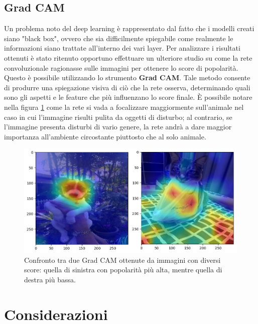 \subsection{Grad CAM}

Un problema noto del deep learning è rappresentato dal fatto che i modelli creati siano "black box", ovvero che sia difficilmente spiegabile come realmente le informazioni siano trattate all'interno dei vari layer. Per analizzare i risultati ottenuti è stato ritenuto opportuno effettuare un ulteriore studio su come la rete convoluzionale ragionasse sulle immagini per ottenere lo score di popolarità. Questo è possibile utilizzando lo strumento \textbf{Grad CAM}\cite{2019}. Tale metodo consente di produrre una spiegazione visiva di ciò che la rete osserva, determinando quali sono gli aspetti e le feature che più influenzano lo score finale. È possibile notare nella figura \ref{fig:grad-cam} come la rete si vada a focalizzare maggiormente sull'animale nel caso in cui l'immagine risulti pulita da oggetti di disturbo; al contrario, se l'immagine presenta disturbi di vario genere, la rete andrà a dare maggior importanza all'ambiente circostante piuttosto che al solo animale.

\vspace{1cm}

\begin{figure}[h]
        \centering
        \includegraphics[scale=0.6]{Plot/GRAD-CAM.png}
        \caption{Confronto tra due Grad CAM ottenute da immagini con diversi score: quella di sinistra con popolarità più alta, mentre quella di destra più bassa.}
        \label{fig:grad-cam}
\end{figure}
    


\section{Considerazioni}

